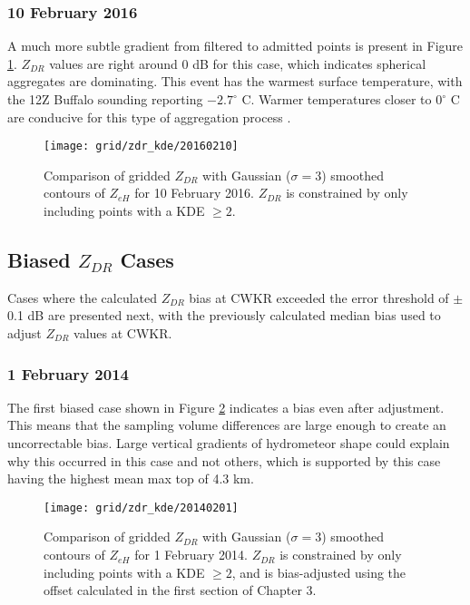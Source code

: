 \subsubsection{10 February 2016}
A much more subtle gradient from filtered to admitted points is present in Figure \ref{fig:grid_zdr_kde_20160210}. $Z_{DR}$ values are right around 0 dB for this case, which indicates spherical aggregates are dominating. This event has the warmest surface temperature, with the 12Z Buffalo sounding reporting $-2.7^{\circ}$ C. Warmer temperatures closer to $0^{\circ}$ C are conducive for this type of aggregation process \citep{Hosler1957}. 
\begin{figure}[H]
\texttt{[image: grid/zdr\_kde/20160210]}
\caption{Comparison of gridded $Z_{DR}$ with Gaussian ($\sigma=3$) smoothed contours of $Z_{eH}$ for 10 February 2016. $Z_{DR}$ is constrained by only including points with a
KDE $\geq 2$.} 
\label{fig:grid_zdr_kde_20160210}
\end{figure}

\subsection{Biased $Z_{DR}$ Cases}
Cases where the calculated $Z_{DR}$ bias at CWKR exceeded the error threshold of $\pm$ 0.1 dB are presented next, with the previously calculated median bias used to adjust $Z_{DR}$ values at CWKR.
\subsubsection{1 February 2014}
The first biased case shown in Figure \ref{fig:grid_zdr_kde_20140201} indicates a bias even after adjustment. This means that the sampling volume differences are large enough to create an uncorrectable bias. Large vertical gradients of hydrometeor shape could explain why this occurred in this case and not others, which is supported by this case having the highest mean max top of 4.3 km. 
\begin{figure}[H]
\texttt{[image: grid/zdr\_kde/20140201]}
\caption{Comparison of gridded $Z_{DR}$ with Gaussian ($\sigma=3$) smoothed contours of $Z_{eH}$ for 1 February 2014. $Z_{DR}$ is constrained by only including points with a
KDE $\geq 2$, and is bias-adjusted using the offset calculated in the first section of Chapter 3.} 
\label{fig:grid_zdr_kde_20140201}
\end{figure}

